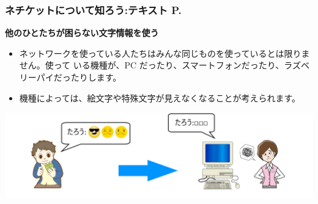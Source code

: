 \documentclass[dvipdfmx]{beamer}
\begin{document}
\begin{frame}[fragile]
	\frametitle{ネチケットについて知ろう:テキスト P.\pageref{1:P:Netiquette}~~~}
    \large\textbf{他のひとたちが困らない文字情報を使う}
            \begin{itemize}
                \item ネットワークを使っている人たちはみんな同じものを使っているとは限りません。使って
                いる機種が、PC だったり、スマートフォンだったり、ラズベリーパイだったりします。
                \item 機種によっては、絵文字や特殊文字が見えなくなることが考えられます。                
            \end{itemize}
            \vfill
            
			\begin{minipage}{\textwidth}
                {\upshape
                  \includegraphics[width=\textwidth]{slide07-img005.png}}
            \end{minipage}
\end{frame}
\end{document}
